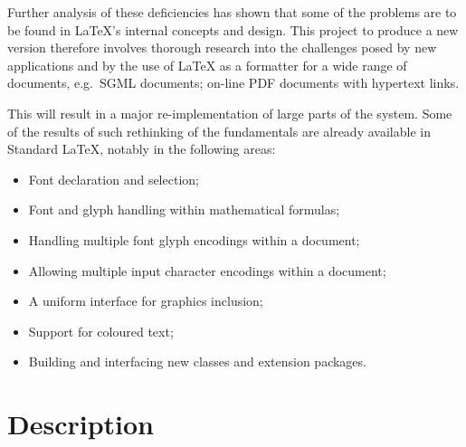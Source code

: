 \documentclass[a4paper]{article}
\newcommand{\eg}{e.g.~}
\newcommand{\SGML}{{\sc SGML}}
\newcommand{\PDF}{{\sc PDF}}
\begin{document}
 Further analysis of these deficiencies has shown that some of the
 problems are to be found in \LaTeX{}'s internal concepts and design.
 This project to produce a new version therefore involves thorough
 research into the challenges posed by new applications and by the use
 of \LaTeX{} as a formatter for a wide range of documents, \eg \SGML{}
 documents; on-line \PDF{} documents with hypertext links.

 This will result in a major re-implementation of large parts of the
 system.  Some of the results of such rethinking of the fundamentals
 are already available in Standard \LaTeX{}, notably in the following
 areas:

\begin{itemize}
\item Font declaration and selection;
\item Font and glyph handling within mathematical formulas;
\item Handling multiple font glyph encodings within a document;
\item Allowing multiple input character encodings within a document;
\item A uniform interface for graphics inclusion;
\item Support for coloured text;
\item Building and interfacing new classes and extension packages.
\end{itemize}


\section{Description}
\end{document}
